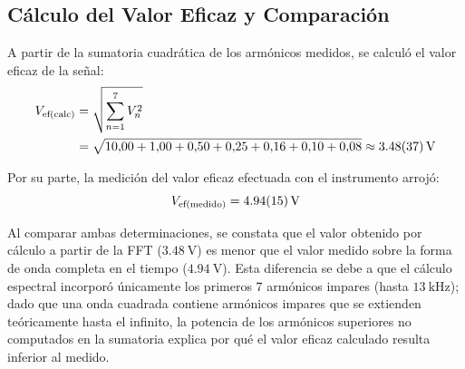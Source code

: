 \begin{table}[!ht]
    \centering
    \caption{Amplitudes armónicas y potencias cuadráticas medidas con ventana Blackman (reemplazo de Flattop no disponible).}
    \label{tab.ej1:amplitudes}
\end{table}

\subsection{Cálculo del Valor Eficaz y Comparación}
A partir de la sumatoria cuadrática de los armónicos medidos, se calculó el valor eficaz de la señal:
\begin{equation}
\begin{aligned}
    V_{\text{ef(calc)}} &= \sqrt{\sum_{n=1}^{7} V_n^2} \\
    &= \sqrt{10{,}00 + 1{,}00 + 0{,}50 + 0{,}25 + 0{,}16 + 0{,}10 + 0{,}08} \approx \qty{3.48 \pm 0.37}{\volt}
\end{aligned}
\label{eq.ej1:vef_calculado}
\end{equation}

Por su parte, la medición del valor eficaz efectuada con el instrumento arrojó:
\begin{equation}
    V_{\text{ef(medido)}} = \qty{4.94 \pm 0.15}{\volt}
    \label{eq.ej1:vef_medido}
\end{equation}

Al comparar ambas determinaciones, se constata que el valor obtenido por cálculo a partir de la FFT ($\qty{3.48}{\volt}$)
es menor que el valor medido sobre la forma de onda completa en el tiempo ($\qty{4.94}{\volt}$). Esta diferencia se debe
a que el cálculo espectral incorporó únicamente los primeros 7 armónicos impares (hasta $\qty{13}{\kilo\hertz}$); dado
que una onda cuadrada contiene armónicos impares que se extienden teóricamente hasta el infinito, la potencia de los
armónicos superiores no computados en la sumatoria explica por qué el valor eficaz calculado resulta inferior al medido.

